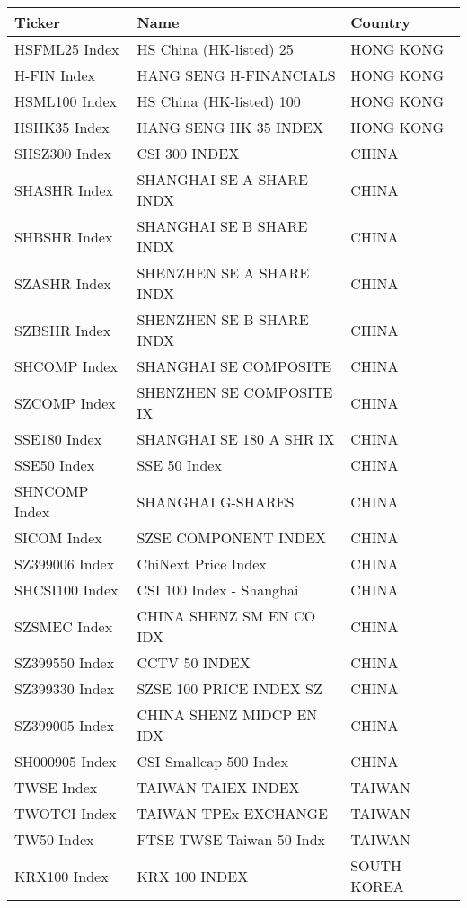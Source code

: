 \begin {table}[H]
\begin{center}
\small
\hspace*{-3cm}
\begin{tabu}{| l l l |} 
\hline
Ticker & Name & Country\\
\hline
HSFML25 Index & HS China (HK-listed) 25 & HONG KONG \\ 
H-FIN Index & HANG SENG H-FINANCIALS & HONG KONG \\ 
HSML100 Index & HS China (HK-listed) 100 & HONG KONG \\ 
HSHK35 Index & HANG SENG HK 35 INDEX & HONG KONG \\ 
SHSZ300 Index & CSI 300 INDEX & CHINA \\ 
SHASHR Index & SHANGHAI SE A SHARE INDX & CHINA \\ 
SHBSHR Index & SHANGHAI SE B SHARE INDX & CHINA \\ 
SZASHR Index & SHENZHEN SE A SHARE INDX & CHINA \\ 
SZBSHR Index & SHENZHEN SE B SHARE INDX & CHINA \\ 
SHCOMP Index & SHANGHAI SE COMPOSITE & CHINA \\ 
SZCOMP Index & SHENZHEN SE COMPOSITE IX & CHINA \\ 
SSE180 Index & SHANGHAI SE 180 A SHR IX & CHINA \\ 
SSE50 Index & SSE 50 Index & CHINA \\ 
SHNCOMP Index & SHANGHAI G-SHARES & CHINA \\ 
SICOM Index & SZSE COMPONENT INDEX & CHINA \\ 
SZ399006 Index & ChiNext Price Index & CHINA \\ 
SHCSI100 Index & CSI 100 Index - Shanghai & CHINA \\ 
SZSMEC Index & CHINA SHENZ SM EN CO IDX & CHINA \\ 
SZ399550 Index & CCTV 50 INDEX & CHINA \\ 
SZ399330 Index & SZSE 100 PRICE INDEX SZ & CHINA \\ 
SZ399005 Index & CHINA SHENZ MIDCP EN IDX & CHINA \\ 
SH000905 Index & CSI Smallcap 500 Index & CHINA \\ 
TWSE Index & TAIWAN TAIEX INDEX & TAIWAN \\ 
TWOTCI Index & TAIWAN TPEx EXCHANGE & TAIWAN \\ 
TW50 Index & FTSE TWSE Taiwan 50 Indx & TAIWAN \\ 
KRX100 Index & KRX 100 INDEX & SOUTH KOREA \\ 

\end{tabu}
\end{center}
\end{table}

